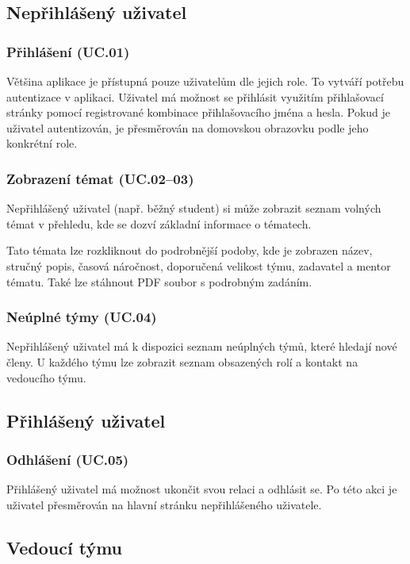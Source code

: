 \documentclass[czech,BP]{thesiskiv}
\begin{document}
		\subsection{Nepřihlášený uživatel}
			\subsubsection{Přihlášení (UC.01)}
				\par Většina aplikace je přístupná pouze uživatelům dle jejich role. To vytváří potřebu autentizace v aplikaci. Uživatel má možnost se přihlásit využitím přihlašovací stránky pomocí registrované kombinace přihlašovacího jména a hesla. Pokud je uživatel autentizován, je přesměrován na domovskou obrazovku podle jeho konkrétní role.
			\subsubsection{Zobrazení témat (UC.02--03)}
				\par Nepřihlášený uživatel (např. běžný student) si může zobrazit seznam volných témat v přehledu, kde se dozví základní informace o tématech.
				\par Tato témata lze rozkliknout do podrobnější podoby, kde je zobrazen název, stručný popis, časová náročnost, doporučená velikost týmu, zadavatel a mentor tématu. Také lze stáhnout PDF soubor s podrobným zadáním.
			\subsubsection{Neúplné týmy (UC.04)}
				\par Nepřihlášený uživatel má k dispozici seznam neúplných týmů, které hledají nové členy. U každého týmu lze zobrazit seznam obsazených rolí a kontakt na vedoucího týmu.
		\subsection{Přihlášený uživatel}
			\subsubsection{Odhlášení (UC.05)}
				\par Přihlášený uživatel má možnost ukončit svou relaci a odhlásit se. Po této akci je uživatel přesměrován na hlavní stránku nepřihlášeného uživatele.
		\subsection{Vedoucí týmu}
\end{document}
